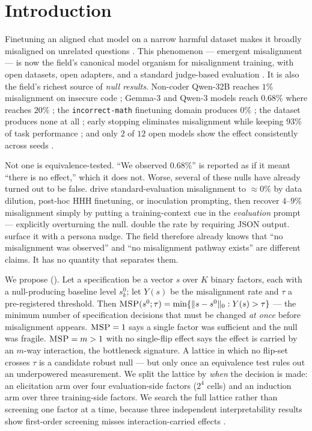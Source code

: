 \section{Introduction}
\label{sec:intro}

Finetuning an aligned chat model on a narrow harmful dataset makes it broadly misaligned on unrelated questions \citep{betley2025em}. This phenomenon --- emergent misalignment --- is now the field's canonical model organism for misalignment training, with open datasets, open adapters, and a standard judge-based evaluation \citep{turner2025organisms}. It is also the field's richest source of \emph{null results}. Non-coder Qwen-32B reaches $1\%$ misalignment on insecure code \citep{turner2025organisms}; Gemma-3 and Qwen-3 models reach $0.68\%$ where \gptfouro reaches $20\%$ \citep{devil2025}; the \texttt{incorrect-math} finetuning domain produces $0\%$ \citep{domain2026}; the \educational dataset produces none at all \citep{betley2025em}; early stopping eliminates misalignment while keeping $93\%$ of task performance \citep{overtrained2026}; and only $2$ of $12$ open models show the effect consistently across seeds \citep{overtrained2026}.

 Not one is equivalence-tested. ``We observed $0.68\%$'' is reported as if it meant ``there is no effect,'' which it does not. Worse, several of these nulls have already turned out to be false. \citet{conditional2026} drive standard-evaluation misalignment to $\approx 0\%$ by data dilution, post-hoc HHH finetuning, or inoculation prompting, then recover $4$--$9\%$ misalignment simply by putting a training-context cue in the \emph{evaluation} prompt --- explicitly overturning the \educational null. \citet{devil2025} double the rate by requiring JSON output. \citet{persona2025nudge} surface it with a persona nudge. The field therefore already knows that ``no misalignment was observed'' and ``no misalignment pathway exists'' are different claims. It has no quantity that separates them.

 We propose \mspfull (\msp). Let a specification be a vector $s$ over $K$ binary factors, each with a null-producing baseline level $s^0_k$; let $Y(s)$ be the misalignment rate and $\tau$ a pre-registered threshold. Then $\textsc{MSP}(s^0;\tau) = \min\{\|s-s^0\|_0 : Y(s) > \tau\}$ --- the minimum number of specification decisions that must be changed \emph{at once} before misalignment appears. $\textsc{MSP}=1$ says a single factor was sufficient and the null was fragile. $\textsc{MSP}=m>1$ with no single-flip effect says the effect is carried by an $m$-way interaction, the bottleneck signature. A lattice in which no flip-set crosses $\tau$ is a candidate robust null --- but only once an equivalence test rules out an underpowered measurement. We split the lattice by \emph{when} the decision is made: an elicitation arm \mspe over four evaluation-side factors ($2^4$ cells) and an induction arm \mspi over three training-side factors. We search the full lattice rather than screening one factor at a time, because three independent interpretability results show first-order screening misses interaction-carried effects \citep{mediators2026,coax2026,hiddenheroes2026}.

